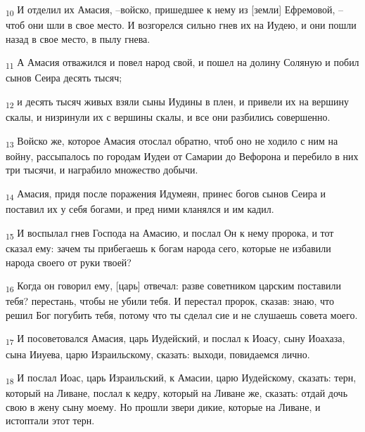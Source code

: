 \begin{tcolorbox}
\textsubscript{10} И отделил их Амасия, --войско, пришедшее к нему из [земли] Ефремовой, --чтоб они шли в свое место. И возгорелся сильно гнев их на Иудею, и они пошли назад в свое место, в пылу гнева.
\end{tcolorbox}
\begin{tcolorbox}
\textsubscript{11} А Амасия отважился и повел народ свой, и пошел на долину Соляную и побил сынов Сеира десять тысяч;
\end{tcolorbox}
\begin{tcolorbox}
\textsubscript{12} и десять тысяч живых взяли сыны Иудины в плен, и привели их на вершину скалы, и низринули их с вершины скалы, и все они разбились совершенно.
\end{tcolorbox}
\begin{tcolorbox}
\textsubscript{13} Войско же, которое Амасия отослал обратно, чтоб оно не ходило с ним на войну, рассыпалось по городам Иудеи от Самарии до Вефорона и перебило в них три тысячи, и награбило множество добычи.
\end{tcolorbox}
\begin{tcolorbox}
\textsubscript{14} Амасия, придя после поражения Идумеян, принес богов сынов Сеира и поставил их у себя богами, и пред ними кланялся и им кадил.
\end{tcolorbox}
\begin{tcolorbox}
\textsubscript{15} И воспылал гнев Господа на Амасию, и послал Он к нему пророка, и тот сказал ему: зачем ты прибегаешь к богам народа сего, которые не избавили народа своего от руки твоей?
\end{tcolorbox}
\begin{tcolorbox}
\textsubscript{16} Когда он говорил ему, [царь] отвечал: разве советником царским поставили тебя? перестань, чтобы не убили тебя. И перестал пророк, сказав: знаю, что решил Бог погубить тебя, потому что ты сделал сие и не слушаешь совета моего.
\end{tcolorbox}
\begin{tcolorbox}
\textsubscript{17} И посоветовался Амасия, царь Иудейский, и послал к Иоасу, сыну Иоахаза, сына Ииуева, царю Израильскому, сказать: выходи, повидаемся лично.
\end{tcolorbox}
\begin{tcolorbox}
\textsubscript{18} И послал Иоас, царь Израильский, к Амасии, царю Иудейскому, сказать: терн, который на Ливане, послал к кедру, который на Ливане же, сказать: отдай дочь свою в жену сыну моему. Но прошли звери дикие, которые на Ливане, и истоптали этот терн.
\end{tcolorbox}
